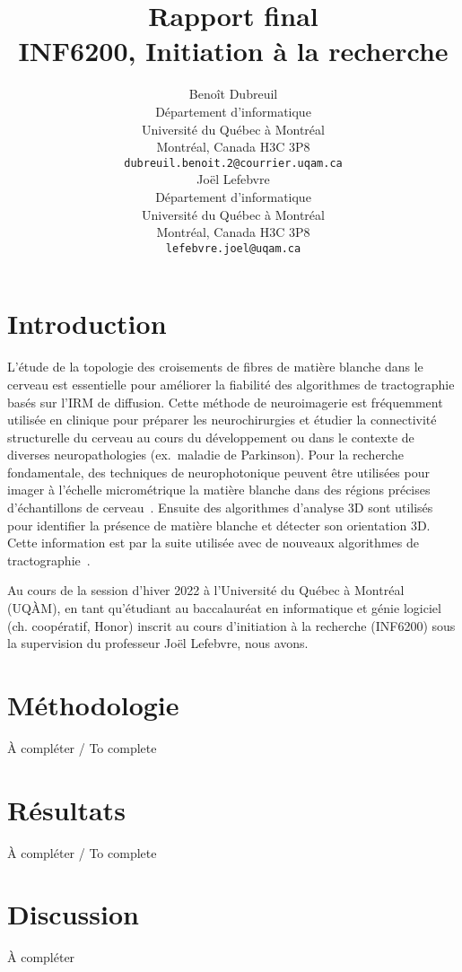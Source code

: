 \documentclass{article}
\title{
  Rapport final \\
  INF6200, Initiation à la recherche}
\author{
  Benoît Dubreuil \\
  Département d'informatique \\ %
  Université du Québec à Montréal \\
  Montréal, Canada H3C 3P8 \\
  \texttt{dubreuil.benoit.2@courrier.uqam.ca} \\
  \And
  Joël Lefebvre \\ %
  Département d'informatique\\
  Université du Québec à Montréal \\
  Montréal, Canada H3C 3P8\\
  \texttt{lefebvre.joel@uqam.ca} \\
}
\begin{document}
  \maketitle


  \section{Introduction}
  \label{sec:introduction}
  L'étude de la topologie des croisements de fibres de matière blanche dans le cerveau est essentielle pour améliorer la fiabilité des algorithmes de tractographie
  basés sur l'IRM de diffusion.
  Cette méthode de neuroimagerie est fréquemment utilisée en clinique pour préparer les neurochirurgies et étudier la connectivité structurelle du cerveau au cours du
  développement ou dans le contexte de diverses neuropathologies (ex.\ maladie de Parkinson).
  Pour la recherche fondamentale, des techniques de neurophotonique peuvent être utilisées pour imager à l’échelle micrométrique la matière blanche dans des régions
  précises d'échantillons de cerveau~\cite{lefebvre2021oct}.
  Ensuite des algorithmes d'analyse 3D sont utilisés pour identifier la présence de matière blanche et détecter son orientation 3D\@.
  Cette information est par la suite utilisée avec de nouveaux algorithmes de tractographie~\cite{oliveirasicard2021orientation3d}.

  Au cours de la session d'hiver 2022 à l'Université du Québec à Montréal (UQÀM), en tant qu'étudiant au baccalauréat en informatique et génie logiciel (ch.
  coopératif, Honor) inscrit au cours d'initiation à la recherche (INF6200) sous la supervision du professeur Joël Lefebvre, nous avons. %


  \section{Méthodologie}
  \label{sec:methodology}
  À compléter / To complete


  \section{Résultats}
  \label{sec:results}
  À compléter / To complete


  \section{Discussion}
  \label{sec:discussion}
  À compléter
\end{document}
